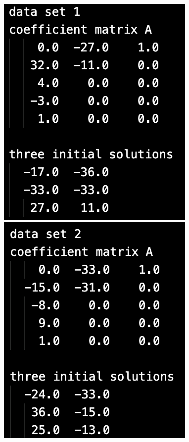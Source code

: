 \documentclass[12pt]{jarticle}
\begin{document}
\begin{figure}[h]
    \begin{minipage}{0.3\hsize}
        \begin{center}
            \includegraphics[scale=0.35]{kadai1_2data1.png}
        \end{center}
    \end{minipage}
    \begin{minipage}{0.3\hsize}
        \begin{center}
            \includegraphics[scale=0.35]{kadai1_2data2.png}

\end{center}
\end{minipage}
\end{figure}
\end{document}

